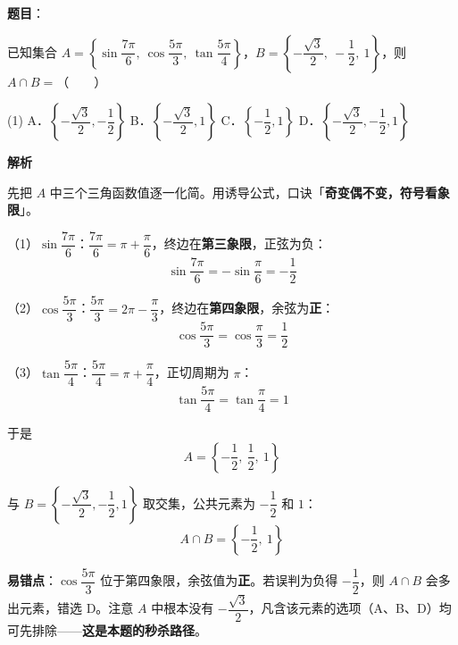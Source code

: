 \begin{answer}

\textbf{题目}：

已知集合 $A=\left\{\sin\dfrac{7\pi}{6},\ \cos\dfrac{5\pi}{3},\ \tan\dfrac{5\pi}{4}\right\}$，$B=\left\{-\dfrac{\sqrt{3}}{2},\ -\dfrac{1}{2},\ 1\right\}$，则 $A\cap B=$\mbox{（　　）}

\begin{gkopts}(1)
\task A．$\left\{-\dfrac{\sqrt{3}}{2},-\dfrac{1}{2}\right\}$
\task B．$\left\{-\dfrac{\sqrt{3}}{2},1\right\}$
\task C．$\left\{-\dfrac{1}{2},1\right\}$
\task D．$\left\{-\dfrac{\sqrt{3}}{2},-\dfrac{1}{2},1\right\}$
\end{gkopts}

\textbf{解析}

先把 $A$ 中三个三角函数值逐一化简。用诱导公式，口诀「\textbf{奇变偶不变，符号看象限}」。

（1）\textbf{$\sin\dfrac{7\pi}{6}$}：$\dfrac{7\pi}{6}=\pi+\dfrac{\pi}{6}$，终边在\textbf{第三象限}，正弦为负：
\nopagebreak[4]
\[\sin\dfrac{7\pi}{6}=-\sin\dfrac{\pi}{6}=-\frac12\]

（2）\textbf{$\cos\dfrac{5\pi}{3}$}：$\dfrac{5\pi}{3}=2\pi-\dfrac{\pi}{3}$，终边在\textbf{第四象限}，余弦为\textbf{正}：
\nopagebreak[4]
\[\cos\dfrac{5\pi}{3}=\cos\dfrac{\pi}{3}=\frac12\]

（3）\textbf{$\tan\dfrac{5\pi}{4}$}：$\dfrac{5\pi}{4}=\pi+\dfrac{\pi}{4}$，正切周期为 $\pi$：
\nopagebreak[4]
\[\tan\dfrac{5\pi}{4}=\tan\dfrac{\pi}{4}=1\]

于是
\nopagebreak[4]
\[A=\left\{-\frac12,\ \frac12,\ 1\right\}\]

与 $B=\left\{-\dfrac{\sqrt3}{2},-\dfrac12,1\right\}$ 取交集，公共元素为 $-\dfrac12$ 和 $1$：
\nopagebreak[4]
\[A\cap B=\left\{-\frac12,\ 1\right\}\]

\begin{gktip}
\textbf{易错点}：$\cos\dfrac{5\pi}{3}$ 位于第四象限，余弦值为\textbf{正}。若误判为负得 $-\dfrac12$，则 $A\cap B$ 会多出元素，错选 D。注意 $A$ 中根本没有 $-\dfrac{\sqrt3}{2}$，凡含该元素的选项（A、B、D）均可先排除——\textbf{这是本题的秒杀路径}。
\end{gktip}


\par\medskip

\end{answer}
